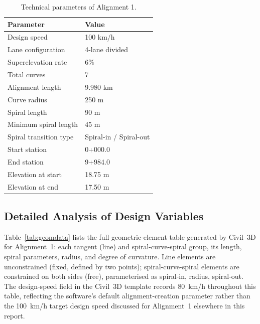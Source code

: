 \documentclass[11pt]{article}
\begin{document}
\begin{table}[H]
  \centering
  \caption{Technical parameters of Alignment 1.}
  \begin{tabular}{@{}ll@{}}
    \toprule
    \textbf{Parameter} & \textbf{Value} \\
    \midrule
    Design speed & 100 km/h \\
    Lane configuration & 4-lane divided \\
    Superelevation rate & 6\% \\
    Total curves & 7 \\
    Alignment length & 9.980 km \\
    Curve radius & 250 m \\
    Spiral length & 90 m \\
    Minimum spiral length & 45 m \\
    Spiral transition type & Spiral-in / Spiral-out \\
    Start station & 0+000.0 \\
    End station & 9+984.0 \\
    Elevation at start & 18.75 m \\
    Elevation at end & 17.50 m \\
    \bottomrule
  \end{tabular}
\end{table}

\subsection{Detailed Analysis of Design Variables}
Table~\ref{tab:geomdata} lists the full geometric-element table generated by Civil~3D for Alignment~1:
each tangent (line) and spiral-curve-spiral group, its length, spiral parameters, radius, and degree of
curvature. Line elements are unconstrained (fixed, defined by two points); spiral-curve-spiral elements
are constrained on both sides (free), parameterised as spiral-in, radius, spiral-out. The design-speed
field in the Civil~3D template records 80~km/h throughout this table, reflecting the software's default
alignment-creation parameter rather than the 100~km/h target design speed discussed for Alignment~1
elsewhere in this report.
\end{document}
